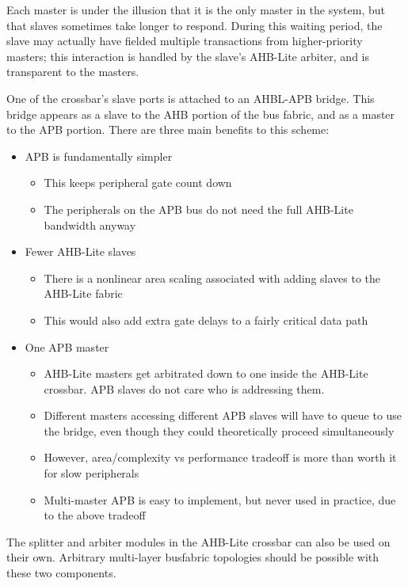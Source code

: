 Each master is under the illusion that it is the only master in the system, but that slaves sometimes take longer to respond. During this waiting period, the slave may actually have fielded multiple transactions from higher-priority masters; this interaction is handled by the slave's AHB-Lite arbiter, and is transparent to the masters.

One of the crossbar's slave ports is attached to an AHBL-APB bridge. This bridge appears as a slave to the AHB portion of the bus fabric, and as a master to the APB portion. There are three main benefits to this scheme:

\begin{itemize}
	\item APB is fundamentally simpler
	\begin{itemize}
		\item This keeps peripheral gate count down
		\item The peripherals on the APB bus do not need the full AHB-Lite bandwidth anyway
	\end{itemize}
	\item Fewer AHB-Lite slaves
	\begin{itemize}
		\item There is a nonlinear area scaling associated with adding slaves to the AHB-Lite fabric
		\item This would also add extra gate delays to a fairly critical data path
	\end{itemize}
	\item One APB master
	\begin{itemize}
		\item AHB-Lite masters get arbitrated down to one inside the AHB-Lite crossbar. APB slaves do not care who is addressing them.
		\item Different masters accessing different APB slaves will have to queue to use the bridge, even though they could theoretically proceed simultaneously
		\item However, area/complexity vs performance tradeoff is more than worth it for slow peripherals
		\item Multi-master APB is easy to implement, but never used in practice, due to the above tradeoff
	\end{itemize}
\end{itemize}

The splitter and arbiter modules in the AHB-Lite crossbar can also be used on their own. Arbitrary multi-layer busfabric topologies should be possible with these two components.

